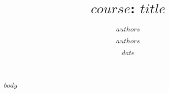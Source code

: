 \documentclass[11pt,a4paper]{article}
\author{$authors$}
\date{$date$}
\numberwithin{equation}{section} %
\begin{document}
\thispagestyle{plain}
\title {\textbf{$course$: $title$}} 
\author {$authors$}
\maketitle
{}
\makeatletter
\renewcommand*\env@matrix[1][*\c@MaxMatrixCols c]{%
  \hskip -\arraycolsep
  \let\@ifnextchar\new@ifnextchar
  \array{#1}}
\makeatother

$body$
\end{document}
